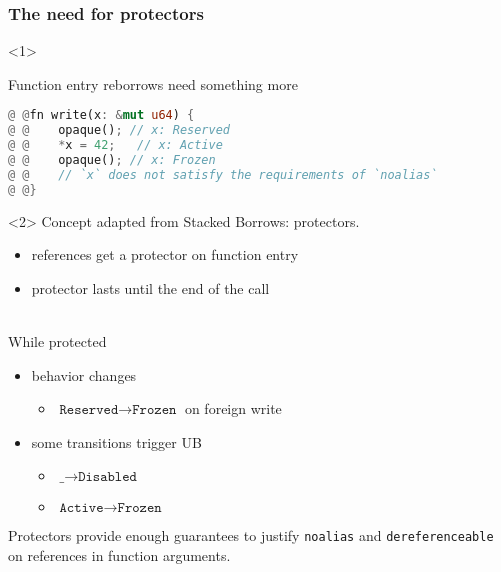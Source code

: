 \begin{frame}[fragile]
    \frametitle{The need for protectors}
    \begin{onlyenv}<1>
        \begin{block}{Function entry reborrows need something more}
            \begin{lstlisting}[language=rust, escapechar=@]
@ @fn write(x: &mut u64) {
@ @    opaque(); // x: Reserved
@ @    *x = 42;   // x: Active
@ @    opaque(); // x: Frozen
@ @    // `x` does not satisfy the requirements of `noalias`
@ @}
            \end{lstlisting}
        \end{block}
    \end{onlyenv}

    \begin{onlyenv}<2>
        Concept adapted from Stacked Borrows: protectors.
        \begin{itemize}
            \item references get a protector on function entry
            \item protector lasts until the end of the call
        \end{itemize}
        ~\\
        While protected
        \begin{itemize}
            \item behavior changes
                \begin{itemize}
                    \item \(\texttt{Reserved} \to \texttt{Frozen}\) on foreign write
                \end{itemize}
            \item some transitions trigger UB
                \begin{itemize}
                    \item \(\texttt{\_} \to \texttt{Disabled}\)
                    \item \(\texttt{Active} \to \texttt{Frozen}\)
                \end{itemize}
        \end{itemize}

        \begin{block}{}
            Protectors provide enough guarantees to justify \texttt{noalias} and
            \texttt{dereferenceable} on references in function arguments.
        \end{block}
    \end{onlyenv}
\end{frame}


